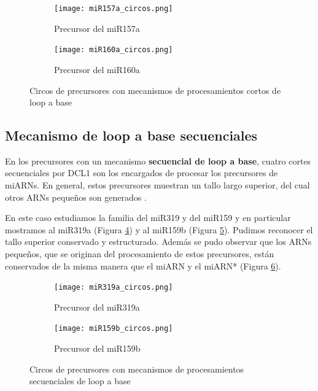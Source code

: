 \begin{landscape}
	\begin{figure}
	\centering
	\begin{subfigure}{.75\textwidth}
	  \centering
	  \texttt{[image: miR157a\_circos.png]}
	  \caption{Precursor del miR157a}
	  \label{subfig:miR157a_circos}
	\end{subfigure}%
	\begin{subfigure}{.75\textwidth}
	  \centering
	  \texttt{[image: miR160a\_circos.png]}
	  \caption{Precursor del miR160a}
	  \label{subfig:miR160a_circos}
	\end{subfigure}
	\caption{Circos de precursores con mecanismos de procesamientos cortos de loop a base}
	\label{fig:srLTB_circos}
	\end{figure}
\end{landscape}

\subsection{Mecanismo de loop a base secuenciales}

En los precursores con un mecanismo \textbf{secuencial de loop a base}, cuatro cortes secuenciales por DCL1 son los encargados de procesar los precursores de miARNs.
En general, estos precursores muestran un tallo largo superior, del cual otros ARNs pequeños son generados \citep{pmid19850910,Bologna2009,Bologna2013}.

En este caso estudiamos la familia del miR319 y del miR159 y en particular mostramos al miR319a (Figura \ref{subfig:miR319a_circos}) y al miR159b (Figura \ref{subfig:miR159b_circos}).
Pudimos reconocer el tallo superior conservado y estructurado.
Además se pudo observar que los ARNs pequeños, que se originan del procesamiento de estos precursores, están conservados de la misma manera que el miARN y el miARN* (Figura \ref{fig:seqLTBL_circos}).

\begin{landscape}
	\begin{figure}
	\centering
	\begin{subfigure}{.75\textwidth}
	  \centering
	  \texttt{[image: miR319a\_circos.png]}
	  \caption{Precursor del miR319a}
	  \label{subfig:miR319a_circos}
	\end{subfigure}%
	\begin{subfigure}{.75\textwidth}
	  \centering
	  \texttt{[image: miR159b\_circos.png]}
	  \caption{Precursor del miR159b}
	  \label{subfig:miR159b_circos}
	\end{subfigure}
	\caption{Circos de precursores con mecanismos de procesamientos secuenciales de loop a base}
	\label{fig:seqLTBL_circos}
	\end{figure}
\end{landscape}


